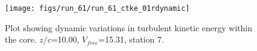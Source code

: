 \begin{figure}[H]
\centering
\texttt{[image: figs/run\_61/run\_61\_ctke\_01rdynamic]}
\caption{Plot showing dynamic variations in turbulent kinetic energy within the core. $z/c$=10.00, $V_{free}$=15.31, station 7.}
\label{fig:run_61_ctke_01rdynamic}
\end{figure}


